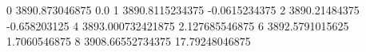 0 3890.873046875 0.0
1 3890.8115234375 -0.0615234375
2 3890.21484375 -0.658203125
4 3893.000732421875 2.127685546875
6 3892.5791015625 1.7060546875
8 3908.66552734375 17.79248046875
